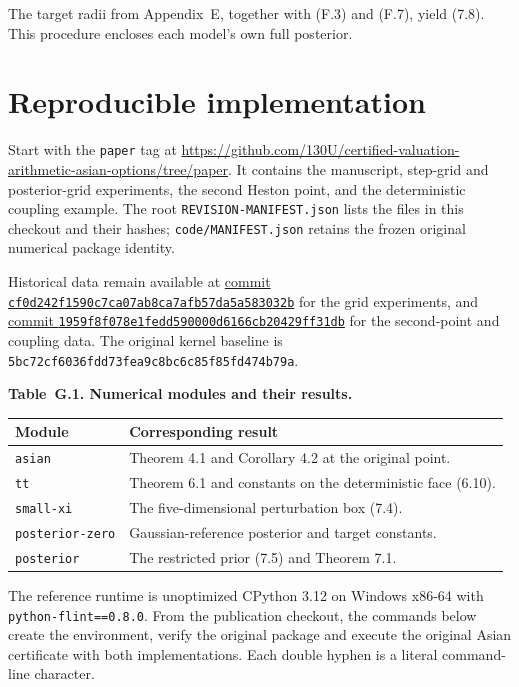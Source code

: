 \documentclass[11pt,a4paper]{article}
\begin{document}
The target radii from Appendix~E, together with (F.3) and (F.7), yield (7.8).
This procedure encloses each model's own full posterior.

\section{Reproducible implementation}

Start with the \texttt{paper} tag at
\url{https://github.com/130U/certified-valuation-arithmetic-asian-options/tree/paper}.
It contains the manuscript, step-grid and posterior-grid experiments, the second
Heston point, and the deterministic coupling example. The root
\texttt{REVISION-MANIFEST.json} lists the files in this checkout and their hashes;
\texttt{code/MANIFEST.json} retains the frozen original numerical package identity.

Historical data remain available at
\href{https://github.com/130U/certified-valuation-arithmetic-asian-options/tree/cf0d242f1590c7ca07ab8ca7afb57da5a583032b}{commit \texttt{cf0d242f1590c7ca07ab8ca7afb57da5a583032b}}
for the grid experiments, and
\href{https://github.com/130U/certified-valuation-arithmetic-asian-options/tree/1959f8f078e1fedd590000d6166cb20429ff31db}{commit \texttt{1959f8f078e1fedd590000d6166cb20429ff31db}}
for the second-point and coupling data. The original kernel baseline is
\texttt{5bc72cf6036fdd73fea9c8bc6c85f85fd474b79a}.

\noindent\textbf{Table~G.1. Numerical modules and their results.}
\begin{center}
\begin{tabularx}{\textwidth}{@{}l X@{}}
\toprule
Module & Corresponding result \\
\midrule
\texttt{asian} & Theorem 4.1 and Corollary 4.2 at the original point. \\
\texttt{tt} & Theorem 6.1 and constants on the deterministic face (6.10). \\
\texttt{small-xi} & The five-dimensional perturbation box (7.4). \\
\texttt{posterior-zero} & Gaussian-reference posterior and target constants. \\
\texttt{posterior} & The restricted prior (7.5) and Theorem 7.1. \\
\bottomrule
\end{tabularx}
\end{center}

The reference runtime is unoptimized CPython 3.12 on Windows x86-64 with
\texttt{python-flint==0.8.0}. From the publication checkout, the commands
below create the environment, verify the original package and execute the original
Asian certificate with both implementations. Each double hyphen is a literal
command-line character.
\end{document}
